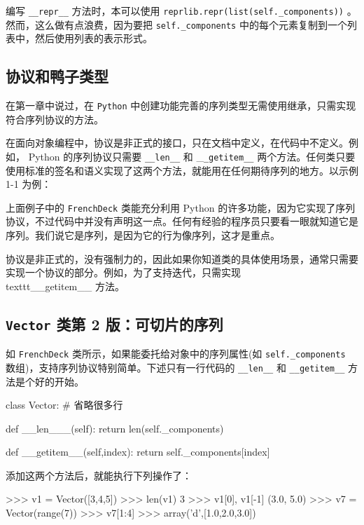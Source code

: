 编写 \texttt{\_\_repr\_\_} 方法时，本可以使用 \texttt{reprlib.repr(list(self.\_components))} 。然而，这么做有点浪费，因为要把 \texttt{self.\_components} 中的每个元素复制到一个列表中，然后使用列表的表示形式。

\subsection{协议和鸭子类型}

在第一章中说过，在 \texttt{Python} 中创建功能完善的序列类型无需使用继承，只需实现符合序列协议的方法。

在面向对象编程中，协议是非正式的接口，只在文档中定义，在代码中不定义。例如， Python 的序列协议只需要 \texttt{\_\_len\_\_} 和 \_\texttt{\_getitem\_\_} 两个方法。任何类只要使用标准的签名和语义实现了这两个方法，就能用在任何期待序列的地方。以示例 1-1 为例：



上面例子中的 \texttt{FrenchDeck} 类能充分利用 Python 的许多功能，因为它实现了序列协议，不过代码中并没有声明这一点。任何有经验的程序员只要看一眼就知道它是序列。我们说它是序列，是因为它的行为像序列，这才是重点。

协议是非正式的，没有强制力的，因此如果你知道类的具体使用场景，通常只需要实现一个协议的部分。例如，为了支持迭代，只需实现 \\texttt{\_\_getitem\_\_} 方法。

\subsection{\texttt{Vector} 类第 2 版：可切片的序列}

如 \texttt{FrenchDeck} 类所示，如果能委托给对象中的序列属性(如 \texttt{self.\_components} 数组)，支持序列协议特别简单。下述只有一行代码的 \texttt{\_\_len\_\_} 和 \texttt{\_\_getitem\_\_} 方法是个好的开始。

\begin{python}
class Vector:
    # 省略很多行

    def __len___(self):
        return len(self._components)

    def __getitem__(self,index):
        return self._components[index]
\end{python}

添加这两个方法后，就能执行下列操作了：
\begin{python}
>>> v1 = Vector([3,4,5])
>>> len(v1)
3
>>> v1[0], v1[-1]
(3.0, 5.0)
>>> v7 = Vector(range(7))
>>> v7[1:4]
>>> array('d',[1.0,2.0,3.0])
\end{python}

